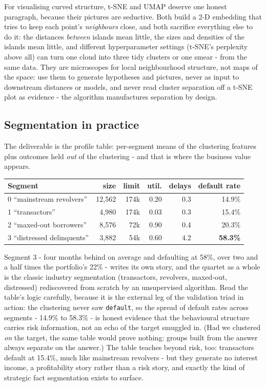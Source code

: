 \documentclass[11pt,a4paper]{article}
\begin{document}
For visualising curved structure, t-SNE and UMAP deserve one honest
paragraph, because their pictures are seductive. Both build a 2-D
embedding that tries to keep each point's \emph{neighbours} close, and
both sacrifice everything else to do it: the distances \emph{between}
islands mean little, the sizes and densities of the islands mean
little, and different hyperparameter settings (t-SNE's perplexity above
all) can turn one cloud into three tidy clusters or one smear - from
the same data. They are microscopes for local neighbourhood structure,
not maps of the space: use them to generate hypotheses and pictures,
never as input to downstream distances or models, and never read
cluster separation off a t-SNE plot as evidence - the algorithm
manufactures separation by design.

\subsection{Segmentation in practice}
The deliverable is the profile table: per-segment means of the clustering
features plus outcomes held \emph{out} of the clustering - and that is
where the business value appears.

\begin{center}\small
\begin{tabular}{@{}lrrrrr@{}}
\toprule
Segment & size & limit & util. & delays & default rate \\
\midrule
0 ``mainstream revolvers'' & 12{,}562 & 174k & 0.20 & 0.3 & 14.9\% \\
1 ``transactors'' & 4{,}980 & 174k & 0.03 & 0.3 & 15.4\% \\
2 ``maxed-out borrowers'' & 8{,}576 & 72k & 0.90 & 0.4 & 20.3\% \\
3 ``distressed delinquents'' & 3{,}882 & 54k & 0.60 & 4.2 & \textbf{58.3\%} \\
\bottomrule
\end{tabular}
\end{center}

Segment 3 - four months behind on average and defaulting at 58\%, over
two and a half times the portfolio's 22\% - writes its own story, and the quartet as
a whole is the classic industry segmentation (transactors, revolvers,
maxed-out, distressed) rediscovered from scratch by an unsupervised
algorithm. Read the table's logic carefully, because it is the external
leg of the validation triad in action: the clustering never saw
\texttt{default}, so the spread of default rates across segments -
14.9\% to 58.3\% - is honest evidence that the behavioural structure
carries risk information, not an echo of the target smuggled in. (Had
we clustered \emph{on} the target, the same table would prove nothing:
groups built from the answer always separate on the answer.) The table
teaches beyond risk, too: transactors default at 15.4\%, much like
mainstream revolvers - but they generate no interest income, a
profitability story rather than a risk story, and exactly the kind of
strategic fact segmentation exists to surface.
\end{document}
